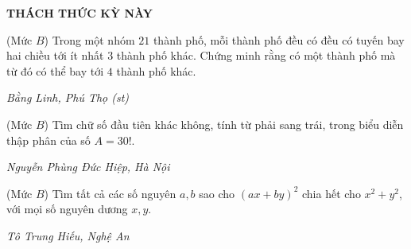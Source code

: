 \begin{center}
	\vspace*{-5pt}
	\textbf{\color{thachthuctoanhoc}\color{thachthuctoanhoc}\color{thachthuctoanhoc}\color{thachthuctoanhoc}\color{thachthuctoanhoc}THÁCH THỨC KỲ NÀY}
	\vspace*{-5pt}
\end{center}
\begin{multicols}{2}
	\setlength{\abovedisplayskip}{4pt}
	\setlength{\belowdisplayskip}{4pt}
	{}
	(Mức $B$) Trong một nhóm $21$ thành phố, mỗi thành phố đều có đều có tuyến bay hai chiều tới ít nhất $3$ thành phố khác. Chứng minh rằng có một thành phố mà từ đó có thể bay tới $4$ thành phố khác. 
	\begin{flushright}
		\textit{Bằng Linh, Phú Thọ (st)}
	\end{flushright}
	{}
	(Mức $B$) Tìm chữ số đầu tiên khác không, tính từ phải sang trái, trong biểu diễn thập phân của số $A=30!$.
	\begin{flushright}
		\textit{Nguyễn Phùng Đức Hiệp, Hà Nội }
	\end{flushright}
	{}
	(Mức $B$) Tìm tất cả các  số nguyên $a,b$ sao cho $(ax+by)^2$ chia hết cho $x^2+y^2$, với mọi số nguyên dương $x,y$.
	\begin{flushright}
		\textit{Tô Trung Hiếu, Nghệ An}
	\end{flushright}
	

\end{multicols}
